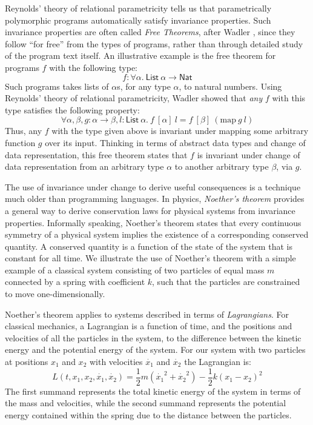 \documentclass[preprint]{sigplanconf}
\theoremstyle{examplestyle}
\begin{document}
Reynolds' theory of relational parametricity \cite{reynolds82} tells
us that parametrically polymorphic programs automatically satisfy
invariance properties. Such invariance properties are often called
\emph{Free Theorems}, after Wadler \cite{wadler89theorems}, since they
follow ``for free'' from the types of programs, rather than through
detailed study of the program text itself. An illustrative example is
the free theorem for programs $f$ with the following type:
\begin{displaymath}
  f : \forall \alpha.~\mathsf{List}~\alpha \to \mathsf{Nat}
\end{displaymath}
Such programs takes lists of $\alpha$s, for any type $\alpha$, to
natural numbers. Using Reynolds' theory of relational parametricity,
Wadler showed that \emph{any} $f$ with this type satisfies the
following property:
\begin{displaymath}
  \forall \alpha, \beta, g : \alpha \to \beta, l : \mathsf{List}~\alpha.~f~[\alpha]~l = f~[\beta]~(\mathrm{map}~g~l)
\end{displaymath}
Thus, any $f$ with the type given above is invariant under mapping
some arbitrary function $g$ over its input. Thinking in terms of
abstract data types and change of data representation, this free
theorem states that $f$ is invariant under change of data
representation from an arbitrary type $\alpha$ to another arbitrary
type $\beta$, via $g$.

The use of invariance under change to derive useful consequences is a
technique much older than programming languages. In physics,
\emph{Noether's theorem} \cite{noether} provides a general way to
derive conservation laws for physical systems from invariance
properties. Informally speaking, Noether's theorem states that every
continuous symmetry of a physical system implies the existence of a
corresponding conserved quantity. A conserved quantity is a function
of the state of the system that is constant for all time. We
illustrate the use of Noether's theorem with a simple example of a
classical system consisting of two particles of equal mass $m$
connected by a spring with coefficient $k$, such that the particles
are constrained to move one-dimensionally.

Noether's theorem applies to systems described in terms of
\emph{Lagrangians}. For classical mechanics, a Lagrangian is a
function of time, and the positions and velocities of all the
particles in the system, to the difference between the kinetic energy
and the potential energy of the system. For our system with two
particles at positions $x_1$ and $x_2$ with velocities $\dot{x_1}$ and
$\dot{x_2}$ the Lagrangian is:
\begin{equation}\label{eq:coupled-spring-lagrangian}
  L(t,x_1,x_2,\dot{x_1},\dot{x_2}) = \frac{1}{2}m(\dot{x_1}^2 + \dot{x_2}^2) - \frac{1}{2}k(x_1 - x_2)^2
\end{equation}
The first summand represents the total kinetic energy of the system in
terms of the mass and velocities, while the second summand represents
the potential energy contained within the spring due to the distance
between the particles.
\end{document}
